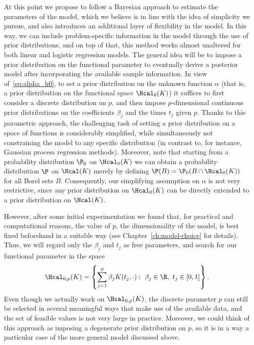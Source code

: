 At this point we propose to follow a Bayesian approach to estimate the parameters of the model, which we believe is in line with the idea of simplicity we pursue, and also introduces an additional layer of flexibility in the model. In this way, we can include problem-specific information in the model through the use of prior distributions, and on top of that, this method works almost unaltered for both linear and logistic regression models. The general idea will be to impose a prior distribution on the functional parameter to eventually derive a posterior model after incorporating the available sample information. In view of~\eqref{eq:alpha_h0}, to set a prior distribution on the unknown function \(\alpha\) (that is, a prior distribution on the functional space \(\Hcal_0(K)\)) it suffices to first consider a discrete distribution on \(p\), and then impose \(p\)-dimensional continuous prior distributions on the coefficients \(\beta_j\) and the times \(t_j\) given \(p\). Thanks to this parametric approach, the challenging task of setting a prior distribution on a space of functions is considerably simplified, while simultaneously not constraining the model to any specific distribution (in contrast to, for instance, Gaussian process regression methods). Moreover, note that starting from a probability distribution \(\P_0\) on \(\Hcal_0(K)\) we can obtain a probability distribution \(\P\) on \(\Hcal(K)\) merely by defining \(\P(B) = \P_0(B\cap \Hcal_0(K))\) for all Borel sets \(B\). Consequently, our simplifying assumption on \(\alpha\) is not very restrictive, since any prior distribution on \(\Hcal_0(K)\) can be directly extended to a prior distribution on \(\Hcal(K)\).

However, after some initial experimentation we found that, for practical and computational reasons, the value of \(p\), the dimensionality of the model, is best fixed beforehand in a suitable way (see Chapter~\ref{ch:model-choice} for details). Thus, we will regard only the \(\beta_j\) and \(t_j\) as free parameters, and search for our functional parameter in the space
\begin{equation}\label{eq:h0p}
\Hcal_{0,p}(K)=\left\{ \sum_{j=1}^p \beta_j K(t_j, \cdot): \ \beta_j \in \R, \ t_j \in [0, 1]\right\}.
\end{equation}
Even though we actually work on \(\Hcal_{0,p}(K)\), the discrete parameter \(p\) can still be selected in several meaningful ways that make use of the available data, and the set of feasible values is not very large in practice. Moreover, we could think of this approach as imposing a degenerate prior distribution on \(p\), so it is in a way a particular case of the more general model discussed above.

